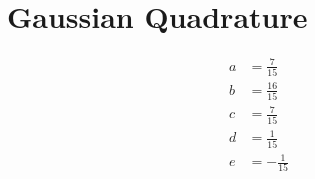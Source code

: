 \documentclass[12pt]{article}
\begin{document}
  \section{Gaussian Quadrature}
  
  \begin{align}
    a &= \frac{7}{15}   \nonumber \\
    b &= \frac{16}{15}  \nonumber \\
    c &= \frac{7}{15}   \nonumber \\
    d &= \frac{1}{15}   \nonumber \\
    e &= -\frac{1}{15}  \nonumber
  \end{align}
\end{document}
